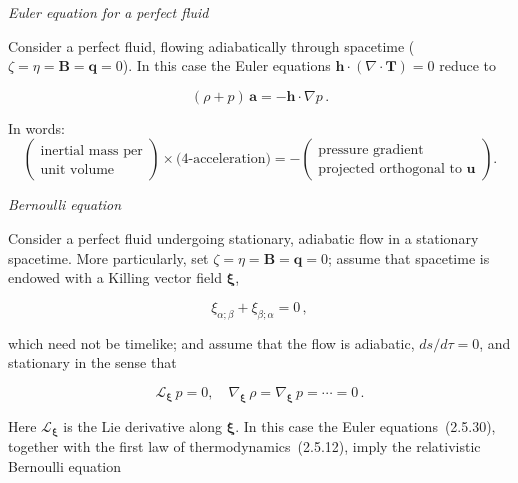\documentclass[aps,prd,twocolumn,superscriptaddress,nofootinbib]{revtex4-2}
\newcommand{\fvec}[1]{\mathbf{#1}}
\begin{document}

\textit{Euler equation for a perfect fluid}

Consider a perfect fluid, flowing adiabatically through spacetime ($\zeta = \eta = \fvec{B} = \fvec{q} = 0$).
In this case the Euler equations $\fvec{h}\cdot(\nabla\cdot\fvec{T}) = 0$ reduce to

\begin{equation}
(\rho + p)\,\fvec{a} = -\fvec{h}\cdot\nabla p\,.
\tag{2.5.30}
\end{equation}

In words:
\begin{equation*}
\left(\!\!
\begin{array}{c}
\text{inertial mass per}\\
\text{unit volume}
\end{array}
\!\!\right)
\times\text{(4-acceleration)}
= -\left(\!\!
\begin{array}{c}
\text{pressure gradient}\\
\text{projected orthogonal to }\fvec{u}
\end{array}
\!\!\right).
\end{equation*}

\bigskip
\textit{Bernoulli equation}

Consider a perfect fluid undergoing stationary, adiabatic flow in a stationary
spacetime.  More particularly, set $\zeta = \eta = \fvec{B} = \fvec{q} = 0$; assume that spacetime is
endowed with a Killing vector field $\boldsymbol{\xi}$,

\begin{equation}
\xi_{\alpha;\beta} + \xi_{\beta;\alpha} = 0\,,
\tag{2.5.31}
\end{equation}

which need not be timelike; and assume that the flow is adiabatic, $ds/d\tau = 0$,
and stationary in the sense that

\begin{equation}
\mathscr{L}_{\boldsymbol{\xi}}\,p = 0, \quad
\nabla_{\boldsymbol{\xi}}\,\rho = \nabla_{\boldsymbol{\xi}}\,p = \cdots = 0\,.
\tag{2.5.32}
\end{equation}

Here $\mathscr{L}_{\boldsymbol{\xi}}$ is the Lie derivative along $\boldsymbol{\xi}$.  In this case the Euler equations~(2.5.30),
together with the first law of thermodynamics~(2.5.12), imply the relativistic
Bernoulli equation
\end{document}
